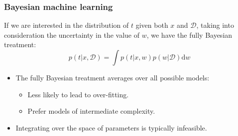 \documentclass{beamer}
\begin{document}
\begin{frame}
    \frametitle{Bayesian machine learning}
    If we are interested in the distribution of $t$ given both $x$ and $\mathcal{D}$, taking into consideration the uncertainty in the value of $w$, we have the fully Bayesian treatment:
    \begin{equation*}
        p(t|x,\mathcal{D})=\int{}p(t|x,w)p(w|\mathcal{D})\mathrm{d}w
    \end{equation*}
    \begin{itemize}
        \item The fully Bayesian treatment averages over all possible models:
        \begin{itemize}
            \item Less likely to lead to over-fitting.
            \item Prefer models of intermediate complexity.
        \end{itemize}
        \item Integrating over the space of parameters is typically infeasible.
    \end{itemize}
\end{frame}
\end{document}
